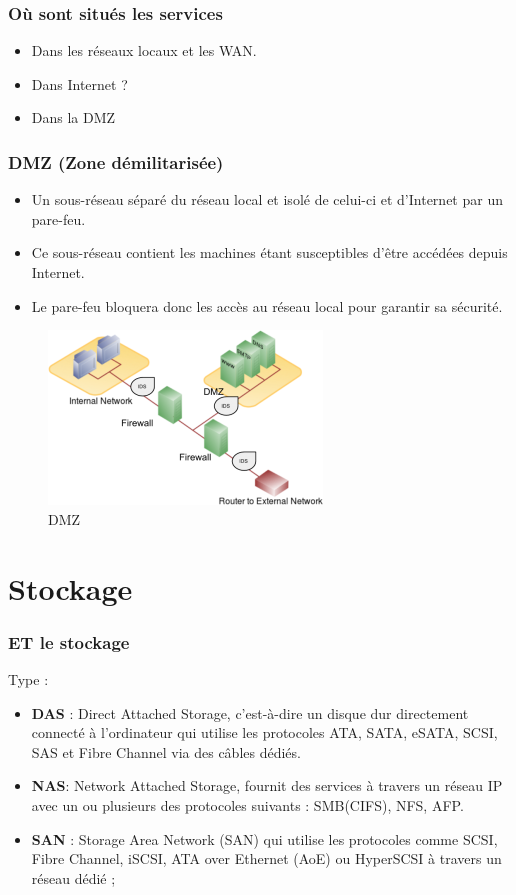 	\begin{frame}[containsverbatim]
		\frametitle{Où sont situés les services}
		\begin{itemize}
			\item Dans les réseaux locaux et les WAN.
			\item Dans Internet ?
			\item Dans la DMZ
		\end{itemize}
		
	\end{frame}
	\begin{frame}[containsverbatim]
		\frametitle{DMZ (Zone démilitarisée)}
		\begin{itemize}
			\item  Un sous-réseau séparé du réseau local et isolé de celui-ci et
			d'Internet par un pare-feu.
			\item Ce sous-réseau contient les machines étant susceptibles d'être
			accédées depuis Internet.
			\item Le pare-feu bloquera donc les accès au réseau local pour
			garantir sa sécurité.
		\end{itemize}
		\begin{figure}[!h]
			\centering
			\includegraphics[scale=0.6]{images/dmz}
			\caption{DMZ}
			\label{rand}
		\end{figure}
		
		
	\end{frame}
	\section{Stockage}
	\begin{frame}[containsverbatim]
		\frametitle{ET le stockage}
		Type : 
		\begin{itemize}
			\item  \textbf{DAS} : Direct Attached Storage, c'est-à-dire un disque dur
			directement connecté à l'ordinateur qui utilise les protocoles
			ATA, SATA, eSATA, SCSI, SAS et Fibre Channel via des
			câbles dédiés.
			\item \textbf{NAS}: Network Attached Storage, fournit des services à
			travers un réseau IP avec un ou plusieurs des protocoles
			suivants : SMB(CIFS), NFS, AFP.
			\item \textbf{SAN} : Storage Area Network (SAN) qui utilise les protocoles
			comme SCSI, Fibre Channel, iSCSI, ATA over Ethernet
			(AoE) ou HyperSCSI  à travers un réseau dédié ;
		\end{itemize}
		
		
	\end{frame}
	
